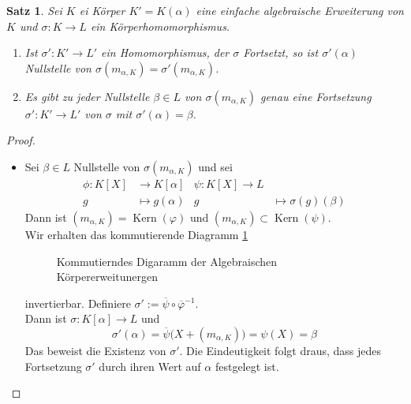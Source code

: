 \documentclass[10pt,a4paper]{article}
\newcommand{\al}{\ensuremath{\alpha}}
\newcommand{\ol}[1]{\overline{#1}}
\newcommand{\Kern}{\operatorname{Kern}}
\theoremstyle{plain}
\newtheorem{satz}[theorem]{Satz}
\theoremstyle{definition}
\theoremstyle{remark}
\begin{document}
 	\begin{satz}\label{satz:nsterhaltung}
 		Sei $K$ ei Körper $K'=K(\al)$ eine einfache algebraische Erweiterung von $K$ und $\sigma:K\to L$ ein Körperhomomorphismus.
 		\begin{enumerate}
 			\item Ist $\sigma':K'\to L'$ ein Homomorphismus, der $\sigma$ Fortsetzt, so ist $\sigma'(\al)$ Nullstelle von $\sigma(m_{\al,K})=\sigma'(m_{\al,K})$.
 			\item Es gibt zu jeder Nullstelle $\beta\in L$ von $\sigma(m_{\al,K})$ genau eine Fortsetzung $\sigma':K'\to L'$ von $\sigma$ mit $\sigma'(\al)=\beta$.
 		\end{enumerate}
 	\end{satz}
 	\begin{proof}
 		\begin{itemize}
 			\setcounter{enumi}{1}
 			\item Sei $\beta\in L$ Nullstelle von $\sigma(m_{\al,K})$ und sei
 			\begin{align*}
 			\phi:K[X]&\to K[\al]&\psi:K[X]\to L\\
 			g&\mapsto g(\al)&g&\mapsto \sigma(g)(\beta)
 			\end{align*}
 			Dann ist $(m_{\al,K})=\Kern(\varphi)$ und $(m_{\al,K})\subset\Kern(\psi)$.\\
 			Wir erhalten das kommutierende Diagramm \ref{fig:cdiag-alg-einf-KE}
 			\begin{figure}
 				\centering
 			\caption{Kommutierndes Digaramm der Algebraischen Körpererweitunergen}
 			\label{fig:cdiag-alg-einf-KE}
 			\end{figure}
 			invertierbar. Definiere $\sigma':=\ol{\psi}\circ\ol{\varphi}^{-1}$.\\
 			Dann ist $\sigma:K[\al]\to L$ und \[\sigma'(\al)=\ol{\psi}\big(X+(m_{\al,K})\big)=\psi(X)=\beta\]
 			Das beweist die Existenz von $\sigma'$. Die Eindeutigkeit folgt draus, dass jedes Fortsetzung $\sigma'$ durch ihren Wert auf $\al$ festgelegt ist.
 		\end{itemize}
 	\end{proof}
 
\end{document}
